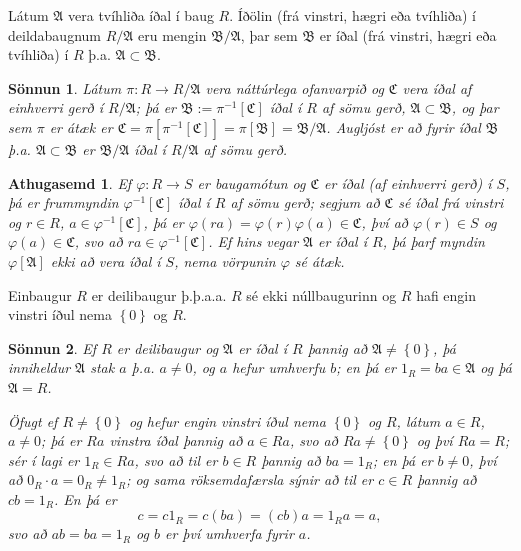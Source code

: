 \documentclass[a4paper,icelandic,11pt]{book}
\theoremstyle{plain}
\newtheorem*{ath}{Athugasemd}
\newtheorem*{sonnun}{Sönnun}
\begin{document}
\begin{setn}
  Látum $\mathfrak A$ vera tvíhliða íðal í baug $R$. Íðölin (frá vinstri, hægri
  eða tvíhliða) í deildabaugnum $R/\mathfrak A$ eru mengin 
  $\mathfrak B/\mathfrak A$, þar sem $\mathfrak B$ er íðal (frá vinstri, hægri
  eða tvíhliða) í $R$ þ.a. $\mathfrak A\subset\mathfrak B$.
\end{setn}
\begin{sonnun}
  Látum $\pi:R\to R/\mathfrak A$ vera náttúrlega ofanvarpið og $\mathfrak C$
  vera íðal af einhverri gerð í $R/\mathfrak A$; þá er $\mathfrak B:=
  \pi^{-1}[\mathfrak C]$ íðal í $R$ af sömu gerð,  $\mathfrak A\subset \mathfrak
  B$, og þar sem $\pi$ er átæk er $\mathfrak C = \pi[\pi^{-1}[\mathfrak C]] =
  \pi[\mathfrak B] = \mathfrak B / \mathfrak A$. Augljóst er að fyrir íðal
  $\mathfrak B$ þ.a. $\mathfrak A\subset \mathfrak B$ er $\mathfrak B /\mathfrak
  A$ íðal í $R/\mathfrak A$ af sömu gerð.
\end{sonnun}
\begin{ath}
  Ef $\varphi:R\to S$ er baugamótun og $\mathfrak C$ er íðal (af einhverri gerð)
  í $S$, þá er frummyndin $\varphi^{-1}[\mathfrak C]$ íðal í $R$ af sömu gerð;
  segjum að $\mathfrak C$ sé íðal frá vinstri og $r\in R$,
  $a\in\varphi^{-1}[\mathfrak C]$, þá er $\varphi(ra) =
  \varphi(r)\varphi(a)\in\mathfrak C$, því að $\varphi(r)\in S$ og
  $\varphi(a)\in\mathfrak C$, svo að $ra\in\varphi^{-1}[\mathfrak C]$. Ef hins
  vegar $\mathfrak A$ er íðal í $R$, þá þarf myndin $\varphi[\mathfrak A]$ ekki
  að vera íðal í $S$, \emph{nema} vörpunin $\varphi$ sé átæk.
\end{ath}
\begin{setn}
  Einbaugur $R$ er deilibaugur þ.þ.a.a. $R$ sé ekki núllbaugurinn og $R$ hafi
  engin vinstri íðul nema $\left\{ 0 \right\}$ og $R$.
\end{setn}
\begin{sonnun}
  Ef $R$ er deilibaugur og $\mathfrak A$ er íðal í $R$ þannig að $\mathfrak
  A\neq\left\{ 0 \right\}$, þá inniheldur $\mathfrak A$ stak $a$ þ.a. $a\neq 0$,
  og $a$ hefur umhverfu $b$; en þá er $1_R = ba\in\mathfrak A$ og þá $\mathfrak
  A = R$.

  Öfugt ef $R\neq \left\{ 0 \right\}$ og hefur engin vinstri íðul nema
  $\left\{ 0 \right\}$ og $R$, látum $a\in R$, $a\neq 0$; þá er $Ra$ vinstra
  íðal þannig að $a\in Ra$, svo að $Ra \neq \left\{ 0 \right\}$ og því
  $Ra = R$; sér í lagi er $1_R \in Ra$, svo að til er $b\in R$ þannig að
  $ba = 1_R$; en þá er $b\neq 0$, því að $0_R\cdot a = 0_R \neq 1_R$; og sama
  röksemdafærsla sýnir að til er $c\in R$ þannig að $cb = 1_R$. En þá er\[
  c = c1_R = c(ba) = (cb)a = 1_R a = a,
  \]
  svo að $ab = ba = 1_R$ og $b$ er því umhverfa fyrir $a$.
\end{sonnun}
\end{document}
